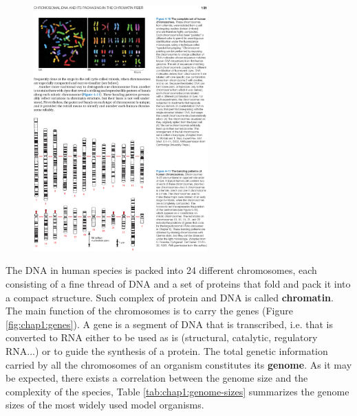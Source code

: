 \begin{figure}[h]
	\begin{minipage}[b]{\linewidth}
	  \centering
	  \includegraphics*[width=0.6\textwidth]{figures/chap1_chromosomes_full}
	  \caption{}
	  \label{fig:chap1:chromosomes}
   \end{minipage}
\end{figure}

The DNA in human species is packed into 24 different chromosomes, each
consisting of a fine thread of DNA and a set of proteins that fold and
pack it into a compact structure. Such complex of protein and DNA is
called {\bf chromatin}. The main function of the chromosomes is to carry
the genes (Figure \ref{fig:chap1:genes}). A gene is a segment of DNA that is transcribed, i.e. that
is converted to RNA either to be used as is (structural, catalytic,
regulatory RNA...) or to guide the synthesis of a protein. The 
total genetic information carried by all the chromosomes of an
organism constitutes its {\bf genome}. As it may be expected, there
exists a correlation between the genome size and the complexity of the
species, Table \ref{tab:chap1:genome-sizes} summarizes the genome sizes of the most widely used
model organisms.

